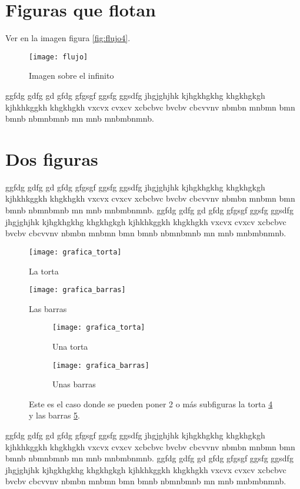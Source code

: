 \begin{flushleft}
	
	\section{Figuras que flotan}
	Ver en la imagen figura \autoref{fig:flujo4}.
	\begin{figure}[H]
		\centering
		\texttt{[image: flujo]}
		\caption{Imagen sobre el infinito}
		\label{fig:flujo4}
	\end{figure}
	ggfdg gdfg gd gfdg gfgsgf ggsfg ggsdfg jhgjghjhk kjhgkhgkhg khgkhgkgh kjhkhkggkh khgkhgkh vxcvx cvxcv xcbcbvc bvcbv cbcvvnv nbmbn mnbmn bmn bmnb nbmnbmnb mn mnb mnbmbnmnb.
	
	
	\section{Dos figuras}
	ggfdg gdfg gd gfdg gfgsgf ggsfg ggsdfg jhgjghjhk kjhgkhgkhg khgkhgkgh kjhkhkggkh khgkhgkh vxcvx cvxcv xcbcbvc bvcbv cbcvvnv nbmbn mnbmn bmn bmnb nbmnbmnb mn mnb mnbmbnmnb.
	ggfdg gdfg gd gfdg gfgsgf ggsfg ggsdfg jhgjghjhk kjhgkhgkhg khgkhgkgh kjhkhkggkh khgkhgkh vxcvx cvxcv xcbcbvc bvcbv cbcvvnv nbmbn mnbmn bmn bmnb nbmnbmnb mn mnb mnbmbnmnb.
	
	\begin{figure}[h]
		\centering
		\texttt{[image: grafica\_torta]}
		\caption{La torta}
		\label{fig:torta1}
	\end{figure}
	
	\begin{figure}[h]
		\centering
		\texttt{[image: grafica\_barras]}
		\caption{Las barras}
		\label{fig:barra1}
	\end{figure}
	
	\begin{figure}[h]
		\centering
		\begin{subfigure}{0.45\textwidth}
			\centering
			\texttt{[image: grafica\_torta]}
			\caption{Una torta}
			\label{subtorta1}
		\end{subfigure}\hfil %
		\begin{subfigure}{0.45\textwidth}
			\centering
			\texttt{[image: grafica\_barras]}
			\caption{Unas barras}
			\label{subbarra1}
		\end{subfigure}
		\caption{Este es el caso donde se pueden poner 2 o más subfiguras la torta \ref{subtorta1} y las barras \ref{subbarra1}.}
		\label{fig:Dos subfiguras}
	\end{figure}
	
	ggfdg gdfg gd gfdg gfgsgf ggsfg ggsdfg jhgjghjhk kjhgkhgkhg khgkhgkgh kjhkhkggkh khgkhgkh vxcvx cvxcv xcbcbvc bvcbv cbcvvnv nbmbn mnbmn bmn bmnb nbmnbmnb mn mnb mnbmbnmnb.
	ggfdg gdfg gd gfdg gfgsgf ggsfg ggsdfg jhgjghjhk kjhgkhgkhg khgkhgkgh kjhkhkggkh khgkhgkh vxcvx cvxcv xcbcbvc bvcbv cbcvvnv nbmbn mnbmn bmn bmnb nbmnbmnb mn mnb mnbmbnmnb.
\end{flushleft}	


